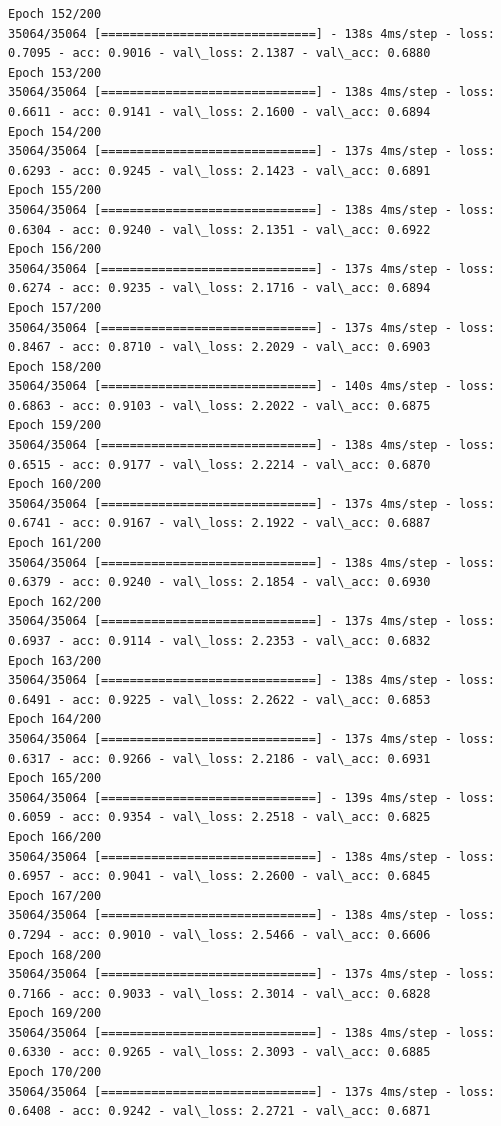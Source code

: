 \documentclass[11pt]{article}
\begin{document}
\begin{Verbatim}[commandchars=\\\{\}]
Epoch 152/200
35064/35064 [==============================] - 138s 4ms/step - loss: 0.7095 - acc: 0.9016 - val\_loss: 2.1387 - val\_acc: 0.6880
Epoch 153/200
35064/35064 [==============================] - 138s 4ms/step - loss: 0.6611 - acc: 0.9141 - val\_loss: 2.1600 - val\_acc: 0.6894
Epoch 154/200
35064/35064 [==============================] - 137s 4ms/step - loss: 0.6293 - acc: 0.9245 - val\_loss: 2.1423 - val\_acc: 0.6891
Epoch 155/200
35064/35064 [==============================] - 138s 4ms/step - loss: 0.6304 - acc: 0.9240 - val\_loss: 2.1351 - val\_acc: 0.6922
Epoch 156/200
35064/35064 [==============================] - 137s 4ms/step - loss: 0.6274 - acc: 0.9235 - val\_loss: 2.1716 - val\_acc: 0.6894
Epoch 157/200
35064/35064 [==============================] - 137s 4ms/step - loss: 0.8467 - acc: 0.8710 - val\_loss: 2.2029 - val\_acc: 0.6903
Epoch 158/200
35064/35064 [==============================] - 140s 4ms/step - loss: 0.6863 - acc: 0.9103 - val\_loss: 2.2022 - val\_acc: 0.6875
Epoch 159/200
35064/35064 [==============================] - 138s 4ms/step - loss: 0.6515 - acc: 0.9177 - val\_loss: 2.2214 - val\_acc: 0.6870
Epoch 160/200
35064/35064 [==============================] - 137s 4ms/step - loss: 0.6741 - acc: 0.9167 - val\_loss: 2.1922 - val\_acc: 0.6887
Epoch 161/200
35064/35064 [==============================] - 138s 4ms/step - loss: 0.6379 - acc: 0.9240 - val\_loss: 2.1854 - val\_acc: 0.6930
Epoch 162/200
35064/35064 [==============================] - 137s 4ms/step - loss: 0.6937 - acc: 0.9114 - val\_loss: 2.2353 - val\_acc: 0.6832
Epoch 163/200
35064/35064 [==============================] - 138s 4ms/step - loss: 0.6491 - acc: 0.9225 - val\_loss: 2.2622 - val\_acc: 0.6853
Epoch 164/200
35064/35064 [==============================] - 137s 4ms/step - loss: 0.6317 - acc: 0.9266 - val\_loss: 2.2186 - val\_acc: 0.6931
Epoch 165/200
35064/35064 [==============================] - 139s 4ms/step - loss: 0.6059 - acc: 0.9354 - val\_loss: 2.2518 - val\_acc: 0.6825
Epoch 166/200
35064/35064 [==============================] - 138s 4ms/step - loss: 0.6957 - acc: 0.9041 - val\_loss: 2.2600 - val\_acc: 0.6845
Epoch 167/200
35064/35064 [==============================] - 138s 4ms/step - loss: 0.7294 - acc: 0.9010 - val\_loss: 2.5466 - val\_acc: 0.6606
Epoch 168/200
35064/35064 [==============================] - 137s 4ms/step - loss: 0.7166 - acc: 0.9033 - val\_loss: 2.3014 - val\_acc: 0.6828
Epoch 169/200
35064/35064 [==============================] - 138s 4ms/step - loss: 0.6330 - acc: 0.9265 - val\_loss: 2.3093 - val\_acc: 0.6885
Epoch 170/200
35064/35064 [==============================] - 137s 4ms/step - loss: 0.6408 - acc: 0.9242 - val\_loss: 2.2721 - val\_acc: 0.6871

\end{Verbatim}
\end{document}
